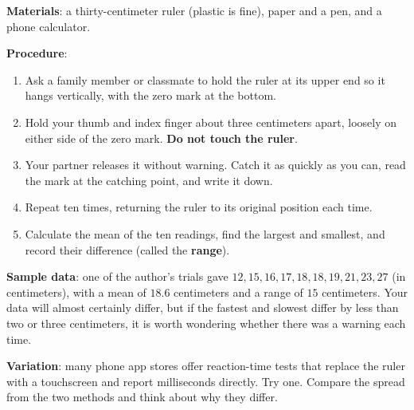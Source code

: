 \begin{experiment}
\textbf{Materials}: a thirty-centimeter ruler (plastic is fine), paper and a pen, and a phone calculator.

\textbf{Procedure}:
\begin{enumerate}[leftmargin=2em]
  \item Ask a family member or classmate to hold the ruler at its upper end so it hangs vertically, with the zero mark at the bottom.
  \item Hold your thumb and index finger about three centimeters apart, loosely on either side of the zero mark. \textbf{Do not touch the ruler}.
  \item Your partner releases it without warning. Catch it as quickly as you can, read the mark at the catching point, and write it down.
  \item Repeat ten times, returning the ruler to its original position each time.
  \item Calculate the mean of the ten readings, find the largest and smallest, and record their difference (called the \textbf{range}).
\end{enumerate}

\textbf{Sample data}: one of the author's trials gave \(12, 15, 16, 17, 18, 18, 19, 21, 23, 27\) (in centimeters), with a mean of \(18.6\) centimeters and a range of \(15\) centimeters. Your data will almost certainly differ, but if the fastest and slowest differ by less than two or three centimeters, it is worth wondering whether there was a warning each time.

\textbf{Variation}: many phone app stores offer reaction-time tests that replace the ruler with a touchscreen and report milliseconds directly. Try one. Compare the spread from the two methods and think about why they differ.
\end{experiment}

\begin{center}
\end{center}

